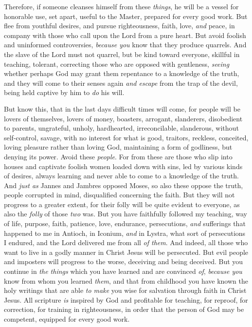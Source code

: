 \begin{biblechapter}
\verse Therefore, if someone cleanses himself from these \textit{things}, he will be a vessel for honorable use, set apart, useful to the Master, prepared for every good work.
\verse But flee from youthful desires, and pursue righteousness, faith, love, \textit{and} peace, in company with those who call upon the Lord from a pure heart.
\verse But avoid foolish and uninformed controversies, \textit{because you} know that they produce quarrels.
\verse And the slave of the Lord must not quarrel, but be kind toward everyone, skillful in teaching, tolerant,
\verse correcting those who are opposed with gentleness, \textit{seeing} whether perhaps God may grant them repentance to a knowledge of the truth,
\verse and they will come to their senses again \textit{and escape} from the trap of the devil, being held captive by him to \textit{do} his will.
\end{biblechapter}

\begin{biblechapter} %
 But know this, that in the last days difficult times will come,
\verse for people will be lovers of themselves, lovers of money, boasters, arrogant, slanderers, disobedient to parents, ungrateful, unholy,
\verse hardhearted, irreconcilable, slanderous, without self-control, savage, with no interest for what is good,
\verse traitors, reckless, conceited, loving pleasure rather than loving God,
\verse maintaining a form of godliness, but denying its power. Avoid these \textit{people}.
\verse For from these are those who slip into houses and captivate foolish women loaded down with sins, led by various kinds of desires,
\verse always learning and never able to come to a knowledge of the truth.
\verse And \textit{just as} Jannes and Jambres opposed Moses, so also these oppose the truth, people corrupted in mind, disqualified concerning the faith.
\verse But they will not progress to a greater extent, for their folly will be quite evident to everyone, as also the \textit{folly} of those \textit{two} was.
 But you have faithfully followed my teaching, way of life, purpose, faith, patience, love, endurance,
\verse persecutions, \textit{and} sufferings that happened to me in Antioch, in Iconium, \textit{and} in Lystra, what sort of persecutions I endured, and the Lord delivered me from all \textit{of them}.
\verse And indeed, all those who want to live in a godly manner in Christ Jesus will be persecuted.
\verse But evil people and imposters will progress to the worse, deceiving and being deceived.
\verse But you continue in \textit{the things} which you have learned and are convinced \textit{of}, \textit{because you} know from whom you learned \textit{them},
\verse and that from childhood you have known the holy writings that are able \textit{to make} you wise for salvation through faith in Christ Jesus.
\verse All scripture \textit{is} inspired by God and profitable for teaching, for reproof, for correction, for training in righteousness,
\verse in order that the person of God may be competent, equipped for every good work.
\end{biblechapter}

